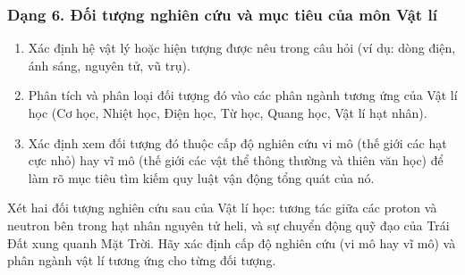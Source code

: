 \subsubsection{Dạng 6. Đối tượng nghiên cứu và mục tiêu của môn Vật lí}
\begin{phuongphap}
\begin{enumerate}
\item Xác định hệ vật lý hoặc hiện tượng được nêu trong câu hỏi (ví dụ: dòng điện, ánh sáng, nguyên tử, vũ trụ).
\item Phân tích và phân loại đối tượng đó vào các phân ngành tương ứng của Vật lí học (Cơ học, Nhiệt học, Điện học, Từ học, Quang học, Vật lí hạt nhân).
\item Xác định xem đối tượng đó thuộc cấp độ nghiên cứu vi mô (thế giới các hạt cực nhỏ) hay vĩ mô (thế giới các vật thể thông thường và thiên văn học) để làm rõ mục tiêu tìm kiếm quy luật vận động tổng quát của nó.
\end{enumerate}
\end{phuongphap}
\begin{vidumau}
Xét hai đối tượng nghiên cứu sau của Vật lí học: tương tác giữa các proton và neutron bên trong hạt nhân nguyên tử heli, và sự chuyển động quỹ đạo của Trái Đất xung quanh Mặt Trời. Hãy xác định cấp độ nghiên cứu (vi mô hay vĩ mô) và phân ngành vật lí tương ứng cho từng đối tượng.
\end{vidumau}

